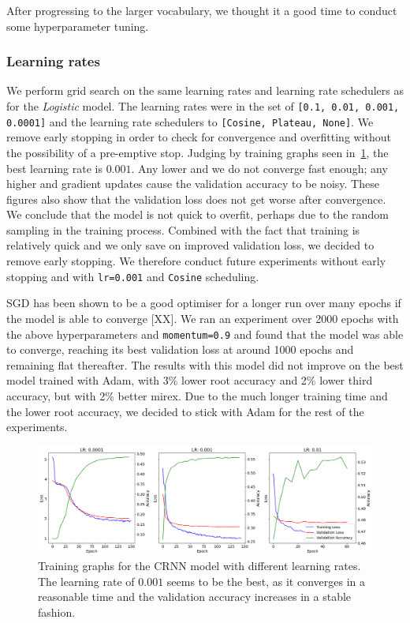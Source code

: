 After progressing to the larger vocabulary, we thought it a good time to conduct some hyperparameter tuning. 

\subsubsection{Learning rates}

We perform grid search on the same learning rates and learning rate schedulers as for the \emph{Logistic} model. The learning rates were in the set of \texttt{[0.1, 0.01, 0.001, 0.0001]} and the learning rate schedulers to \texttt{[Cosine, Plateau, None]}. We remove early stopping in order to check for convergence and overfitting without the possibility of a pre-emptive stop. Judging by training graphs seen in~\ref{fig:lr_search_cosine}, the best learning rate is $0.001$. Any lower and we do not converge fast enough; any higher and gradient updates cause the validation accuracy to be noisy. These figures also show that the validation loss does not get worse after convergence. We conclude that the model is not quick to overfit, perhaps due to the random sampling in the training process. Combined with the fact that training is relatively quick and we only save on improved validation loss, we decided to remove early stopping. We therefore conduct future experiments without early stopping and with \texttt{lr=0.001} and \texttt{Cosine} scheduling.

SGD has been shown to be a good optimiser for a longer run over many epochs if the model is able to converge [XX]. We ran an experiment over 2000 epochs with the above hyperparameters and \texttt{momentum=0.9} and found that the model was able to converge, reaching its best validation loss at around 1000 epochs and remaining flat thereafter. The results with this model did not improve on the best model trained with Adam, with 3\% lower root accuracy and 2\% lower third accuracy, but with 2\% better mirex. Due to the much longer training time and the lower root accuracy, we decided to stick with Adam for the rest of the experiments.

\begin{figure}[H]
    \centering
    \includegraphics[width=1.0\textwidth]{figures/lr_search_cosine.png}
    \caption{Training graphs for the CRNN model with different learning rates. The learning rate of $0.001$ seems to be the best, as it converges in a reasonable time and the validation accuracy increases in a stable fashion.}\label{fig:lr_search_cosine}
\end{figure}

